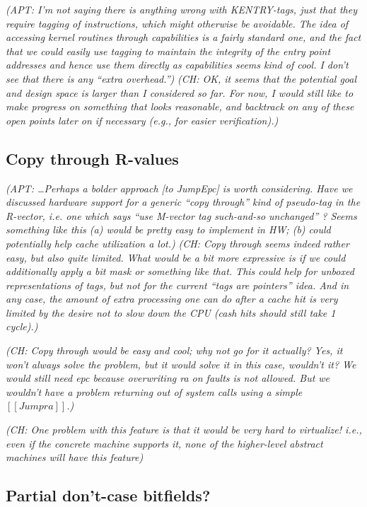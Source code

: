 \documentclass{article}
\newcommand{\ch}[1]{{\color{dkblue}\em (CH: #1)}}
\newcommand{\apt}[1]{{\color{red}\em (APT: #1)}}
\newcommand*{\EG}{e.g.,\xspace}
\newcommand*{\IE}{i.e.,\xspace}
\begin{document}
\apt{I'm not saying there is anything wrong with KENTRY-tags, just that they require 
  tagging of instructions, which might otherwise be avoidable.  
  The idea of accessing kernel routines through capabilities is a fairly
  standard one, and the fact that we could easily use tagging to maintain
  the integrity of the entry point addresses and hence use them directly 
  as capabilities seems kind of cool. I don't see that there is any ``extra overhead.''}
\ch{OK, it seems that the potential goal and design space is larger
  than I considered so far. For now, I would still like to make
  progress on something that looks reasonable, and backtrack on any of
  these open points later on if necessary (\EG for easier
  verification).}

\subsection{Copy through R-values}
\label{sec:copy-r-vals}

\apt{\ldots Perhaps a bolder approach [to JumpEpc] is worth considering.
Have we discussed hardware support
for a generic ``copy through'' kind of pseudo-tag in the R-vector, 
i.e. one which says ``use M-vector tag such-and-so unchanged'' ?
Seems something like this (a) would be pretty easy to implement in HW; 
(b) could potentially help cache utilization a lot.}
\ch{Copy through seems indeed rather easy, but also quite limited.
  What would be a bit more expressive is if we could additionally
  apply a bit mask or something like that. This could help for unboxed
  representations of tags, but not for the current ``tags are
  pointers'' idea. And in any case, the amount of extra processing one
  can do after a cache hit is very limited by the desire not to slow
  down the CPU (cash hits should still take 1 cycle).}

\ch{Copy through would be easy and cool; why not go for it actually?
  Yes, it won't always solve the problem, but it would solve it in
  this case, wouldn't it? We would still need epc because overwriting
  ra on faults is not allowed. But we wouldn't have a problem
  returning out of system calls using a simple $[[Jump ra]]$.}

\ch{One problem with this feature is that it would be very hard to
  virtualize! \IE even if the concrete machine supports it, none of
  the higher-level abstract machines will have this feature}

\subsection{Partial don't-case bitfields?}
\end{document}
